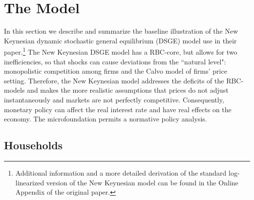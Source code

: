 \documentclass[12pt,a4paper,oneside,titlepage]{article}
\begin{document}
\section{The Model}
In this section we describe and summarize the baseline illustration of the New Keynesian dynamic stochastic general equilibrium (DSGE) model \citet{Erceg.2014} use in their paper.\footnote {Additional information and a more detailed derivation of the standard log-linearized version of the New Keynesian model can be found in the Online Appendix of the original paper.} The New Keynesian DSGE model has a RBC-core, but allows for two inefficiencies, so that shocks can cause deviations from the ``natural level": monopolistic competition among firms and the Calvo model of firms' price setting. Therefore, the New Keynesian model addresses the deficits of the RBC-models and makes the more realistic assumptions that prices do not adjust instantaneously and markets are not perfectly competitive. Consequently, monetary policy can affect the real interest rate and have real effects on the economy. The microfoundation permits a normative policy analysis.
\subsection*{Households}
\end{document}
